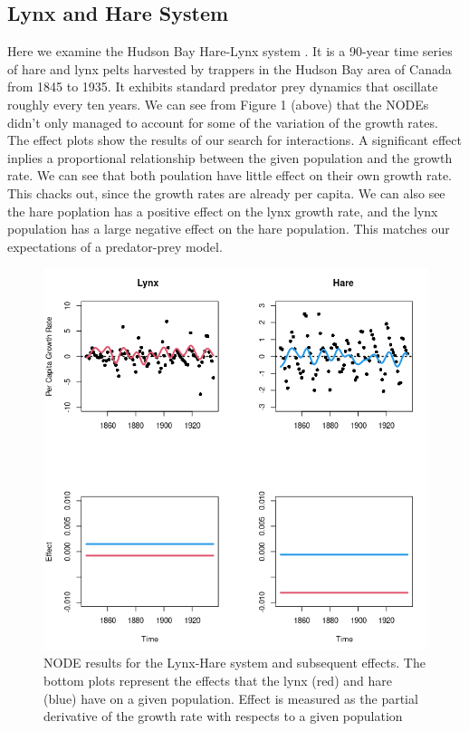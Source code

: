 \documentclass{article}
\begin{document}
\subsection{Lynx and Hare System}
Here we examine the Hudson Bay Hare-Lynx system \cite{lynxharepaper}. It is a 90-year time series of hare and lynx pelts harvested by trappers in the Hudson Bay area of Canada from 1845 to 1935. It exhibits standard predator prey dynamics that oscillate roughly every ten years. We can see from Figure 1 (above) that the NODEs didn't only managed to account for some of the variation of the growth rates. The effect plots show the results of our search for interactions. A significant effect inplies a proportional relationship between the given population and the growth rate. We can see that both poulation have little effect on their own growth rate. This chacks out, since the growth rates are already per capita. We can also see the hare poplation has a positive effect on the lynx growth rate, and the lynx population has a large negative effect on the hare population. This matches our expectations of a predator-prey model.
\begin{figure}
\begin{center}
\centerline{\includegraphics[width=\columnwidth]{lynxhareplot}}
\caption{
NODE results for the Lynx-Hare system and subsequent effects. The bottom plots represent the effects that the lynx (red) and hare (blue) have on a given population. Effect is measured as the partial derivative of the growth rate with respects to a given population
}
\end{center}
\end{figure}
\end{document}
